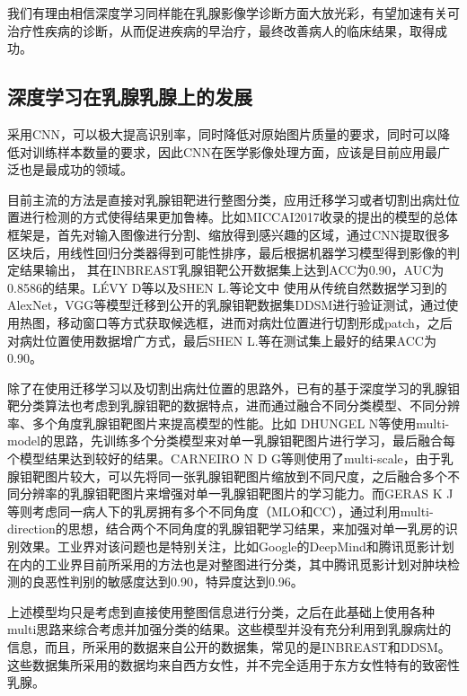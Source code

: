 我们有理由相信深度学习同样能在乳腺影像学诊断方面大放光彩，有望加速有关可治疗性疾病的诊断，从而促进疾病的早治疗，最终改善病人的临床结果，取得成功。
\subsection{深度学习在乳腺乳腺上的发展}
采用CNN，可以极大提高识别率，同时降低对原始图片质量的要求，同时可以降低对训练样本数量的要求，因此CNN在医学影像处理方面，应该是目前应用最广泛也是最成功的领域。

目前主流的方法是直接对乳腺钼靶进行整图分类，应用迁移学习\cite{15pan2010survey}或者切割出病灶位置进行检测的方式使得结果更加鲁棒。比如MICCAI2017收录的\cite{16zhu2017deep}提出的模型的总体框架是，首先对输入图像进行分割、缩放得到感兴趣的区域，通过CNN提取很多区块后，用线性回归分类器得到可能性排序，最后根据机器学习模型得到影像的判定结果输出， 其在INBREAST\cite{27moreira2012inbreast}乳腺钼靶公开数据集上达到ACC为0.90，AUC为0.8586的结果。LÉVY D等\cite{17levy2016breast}以及SHEN L.等\cite{18shen2017end}论文中
使用从传统自然数据学习到的AlexNet\cite{19krizhevsky2012imagenet}，VGG\cite{20simonyan2014very}等模型迁移到公开的乳腺钼靶数据集DDSM\cite{21lee2018curated, 22lee2017curated,23clark2013cancer}进行验证测试，通过使用热图，移动窗口等方式获取候选框，进而对病灶位置进行切割形成patch，之后对病灶位置使用数据增广方式，最后SHEN L.等\cite{18shen2017end}在测试集上最好的结果ACC为0.90。

除了在使用迁移学习以及切割出病灶位置的思路外，已有的基于深度学习的乳腺钼靶分类算法也考虑到乳腺钼靶的数据特点，进而通过融合不同分类模型、不同分辨率、多个角度乳腺钼靶图片来提高模型的性能。比如 DHUNGEL N等\cite{24dhungel2017fully}使用multi-model的思路，先训练多个分类模型来对单一乳腺钼靶图片进行学习，最后融合每个模型结果达到较好的结果。CARNEIRO N D G等\cite{25carneiroautomated}则使用了multi-scale，由于乳腺钼靶图片较大，可以先将同一张乳腺钼靶图片缩放到不同尺度，之后融合多个不同分辨率的乳腺钼靶图片来增强对单一乳腺钼靶图片的学习能力。而GERAS K J等\cite{26geras2017high}则考虑同一病人下的乳房拥有多个不同角度（MLO和CC），通过利用multi-direction的思想，结合两个不同角度的乳腺钼靶学习结果，来加强对单一乳房的识别效果。工业界对该问题也是特别关注，比如Google的DeepMind和腾讯觅影计划在内的工业界目前所采用的方法也是对整图进行分类，其中腾讯觅影计划对肿块检测的良恶性判别的敏感度达到0.90，特异度达到0.96。

上述模型均只是考虑到直接使用整图信息进行分类，之后在此基础上使用各种multi思路来综合考虑并加强分类的结果。这些模型并没有充分利用到乳腺病灶的信息，而且，所采用的数据来自公开的数据集，常见的是INBREAST\cite{27moreira2012inbreast}和DDSM\cite{21lee2018curated, 22lee2017curated,23clark2013cancer}。这些数据集所采用的数据均来自西方女性，并不完全适用于东方女性特有的致密性乳腺。

